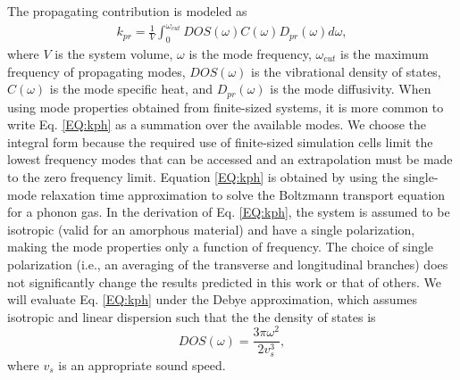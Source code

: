 \documentclass[aps,prb,onecolumn,preprint,superscriptaddress,footinbib,amsmath,amssymb,floatfix]{revtex4}
\begin{document}
The propagating contribution is modeled as
\cite{feldman_thermal_1993,feldman_numerical_1999} 
\begin{equation}\label{EQ:kph}
\begin{split}
k_{pr} = \frac{1}{V}\int_{0}^{\omega_{cut}} 
DOS(\omega) C(\omega) D_{pr}(\omega)d\omega,
\end{split}
\end{equation}
where $V$ is the system volume, $\omega$ is the mode 
frequency, $\omega_{cut}$ is the maximum frequency of propagating 
modes,  
$DOS(\omega)$ is the vibrational 
density of states, $C(\omega)$ is the mode specific heat, 
and $D_{pr}(\omega)$ is the mode diffusivity. When using mode 
properties obtained from finite-sized systems, it is more common 
to write Eq. \eqref{EQ:kph} as a summation over the available modes. 
We choose the integral form because the required use of finite-sized 
simulation cells limit the lowest frequency 
modes that can be accessed and an extrapolation 
must be made to the zero frequency limit.
\cite{love_estimate_1990,feldman_thermal_1993,cahill_thermal_1994,
feldman_numerical_1999,baldi_thermal_2008,
liu_high_2009,yang_anomalously_2010}    
Equation \eqref{EQ:kph} is obtained by using the single-mode relaxation
time approximation to solve 
the Boltzmann transport equation for a phonon gas.
\cite{ziman_electrons_2001} In the derivation of Eq. 
\eqref{EQ:kph}, the system is assumed to be isotropic 
(valid for an amorphous material) 
and have a single polarization,\cite{dove_introduction_1993} 
making the mode properties only a function of frequency. The 
choice of single polarization (i.e., an averaging 
of the transverse and longitudinal branches) 
does not significantly change the results predicted in this work  
or that of others.
\cite{feldman_thermal_1993,cahill_thermal_1994,
feldman_numerical_1999,baldi_thermal_2008,liu_high_2009,
yang_anomalously_2010} 
We will evaluate Eq. \eqref{EQ:kph} under the Debye approximation, 
which assumes isotropic and linear dispersion such that the 
the density of states is
\begin{equation}\label{EQ:DOS_debye}
DOS(\omega) = \frac{3\pi\omega^2}{2v_{s}^3},
\end{equation}
where $v_s$ is an appropriate sound speed.\cite{ashcroft_solid_1976} 
\end{document}
